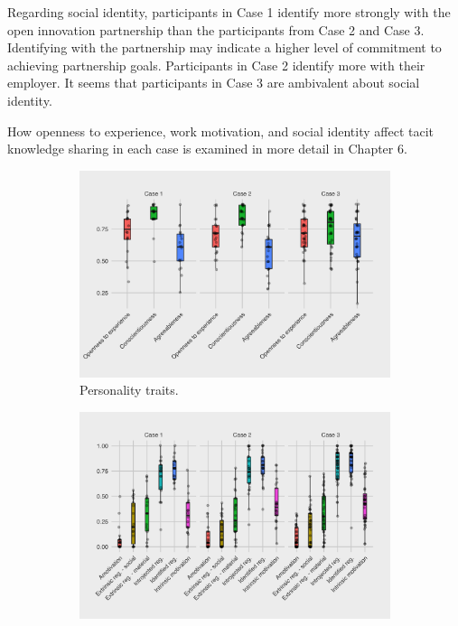 Regarding social identity, participants in Case 1 identify more strongly with the open innovation partnership than the participants from Case 2 and Case 3. Identifying with the partnership may indicate a higher level of commitment to achieving partnership goals. Participants in Case 2 identify more with their employer. It seems that participants in Case 3 are ambivalent about social identity. \medskip

How openness to experience, work motivation, and social identity affect tacit knowledge sharing in each case is examined in more detail in Chapter 6.

\begin{landscape}
\begin{figure}
\centering
\begin{subfigure}[b]{0.7\textwidth}
\centering
\includegraphics[width=\textwidth]{Images/personality_case.png}
\caption[]%
{{\small Personality traits.}}    
\label{fig:personality}
\end{subfigure}
\hfill
\begin{subfigure}[b]{0.7\textwidth}  
\centering 
\includegraphics[width=\textwidth]{Images/work_motivation_case.png}

\end{subfigure}
\end{figure}
\end{landscape}
